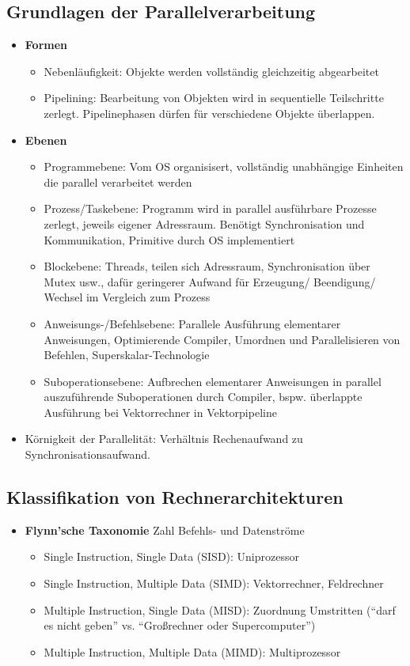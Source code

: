 \subsection{Grundlagen der Parallelverarbeitung}
\begin{itemize}
	\item \textbf{Formen} 
	\begin{itemize}
		\item Nebenläufigkeit: Objekte werden vollständig gleichzeitig abgearbeitet
		\item Pipelining: Bearbeitung von Objekten wird in sequentielle Teilschritte zerlegt. Pipelinephasen dürfen für verschiedene Objekte überlappen.	
	\end{itemize}
	\item \textbf{Ebenen}
	\begin{itemize}
		\item Programmebene: Vom OS organisisert, vollständig unabhängige Einheiten die parallel verarbeitet werden
		\item Prozess/Taskebene: Programm wird in parallel ausführbare Prozesse zerlegt, jeweils eigener Adressraum. Benötigt Synchronisation und Kommunikation, Primitive durch OS implementiert
		\item Blockebene: Threads, teilen sich Adressraum, Synchronisation über Mutex usw., dafür geringerer Aufwand für Erzeugung/ Beendigung/ Wechsel im Vergleich zum Prozess
	\item Anweisungs-/Befehlsebene: Parallele Ausführung elementarer Anweisungen, Optimierende Compiler, Umordnen und Parallelisieren von Befehlen, Superskalar-Technologie
		\item Suboperationsebene: Aufbrechen elementarer Anweisungen in parallel auszuführende Suboperationen durch Compiler, bspw. überlappte Ausführung bei Vektorrechner in Vektorpipeline
	\end{itemize}
	\item Körnigkeit der Parallelität: Verhältnis Rechenaufwand zu Synchronisationsaufwand.
\end{itemize}

\subsection{Klassifikation von Rechnerarchitekturen}
\begin{itemize}
	\item \textbf{Flynn'sche Taxonomie} Zahl Befehls- und Datenströme
	\begin{itemize}
		\item Single Instruction, Single Data (SISD): Uniprozessor
		\item Single Instruction, Multiple Data (SIMD): Vektorrechner, Feldrechner
		\item Multiple Instruction, Single Data (MISD): Zuordnung Umstritten ("`darf es nicht geben"' vs. "`Großrechner oder Supercomputer"')
		\item Multiple Instruction, Multiple Data (MIMD): Multiprozessor
	\end{itemize}
\end{itemize}


